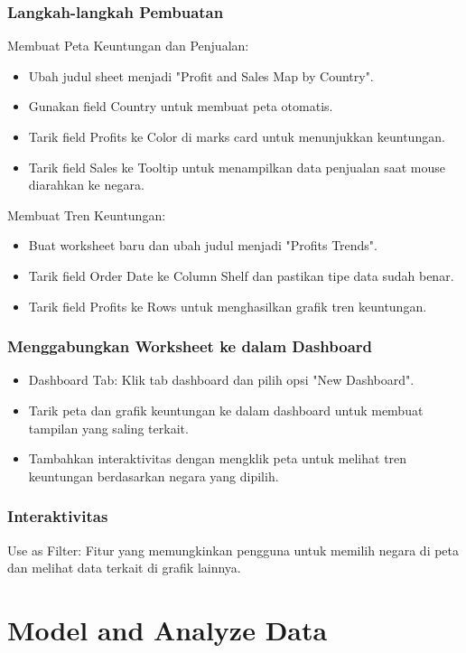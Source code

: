 \documentclass{article}
\begin{document}
\subsubsection{Langkah-langkah Pembuatan}
Membuat Peta Keuntungan dan Penjualan:
\begin{itemize}
    \item Ubah judul sheet menjadi "Profit and Sales Map by Country".
    \item Gunakan field Country untuk membuat peta otomatis.
    \item Tarik field Profits ke Color di marks card untuk menunjukkan keuntungan.
    \item Tarik field Sales ke Tooltip untuk menampilkan data penjualan saat mouse diarahkan ke negara.
\end{itemize}
Membuat Tren Keuntungan:
\begin{itemize}
    \item Buat worksheet baru dan ubah judul menjadi "Profits Trends".
    \item Tarik field Order Date ke Column Shelf dan pastikan tipe data sudah benar.
    \item Tarik field Profits ke Rows untuk menghasilkan grafik tren keuntungan.
\end{itemize}

\subsubsection{Menggabungkan Worksheet ke dalam Dashboard}
\begin{itemize}
    \item Dashboard Tab: Klik tab dashboard dan pilih opsi "New Dashboard".
    \item Tarik peta dan grafik keuntungan ke dalam dashboard untuk membuat tampilan yang saling terkait.
    \item Tambahkan interaktivitas dengan mengklik peta untuk melihat tren keuntungan berdasarkan negara yang dipilih.
\end{itemize}

\subsubsection{Interaktivitas}
Use as Filter: Fitur yang memungkinkan pengguna untuk memilih negara di peta dan melihat data terkait di grafik lainnya.

\newpage

\section{Model and Analyze Data}

\newpage

\end{document}
